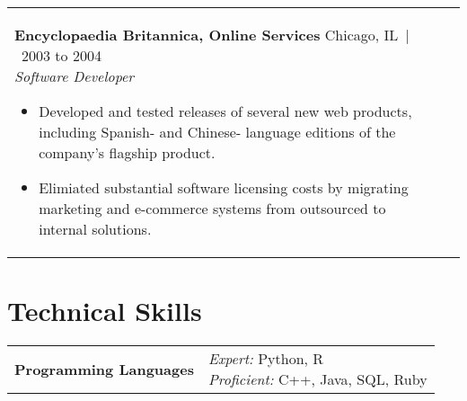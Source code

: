 \documentclass[11pt,letter,sans]{moderncv}
\makeatletter
\newenvironment{entrylistDict}{%
  \begin{tabular*}{\textwidth}{@{\extracolsep{\fill}}ll}
}{%
  \end{tabular*}
}
\newcommand{\entryDict}[2]{%
  \textbf{#1} & \parbox[t]{140mm}{%
    #2%
    \hfill%
    \vspace{\parsep}%
  }\\}
\newenvironment{entrylistFive}{%
  \begin{longtable}{@{\extracolsep{\fill}}ll}
}{%
  \end{longtable}
}
\newcommand{\entryFive}[5]{%
  \parbox[t]{170mm}{%
    \textbf{#2}%
    \hfill%
    {\footnotesize #3~|~#1}\\%
	\emph{#4}\\%
    #5\vspace{\parsep}%
  }\\}
\makeatother
\begin{document}
\begin{entrylistFive}
{\begin{itemize}
\end{itemize}
}
\entryFive
{2003 to 2004}
{Encyclopaedia Britannica, Online Services}
{Chicago, IL}
{Software Developer}
{\vspace{-5mm}
\begin{itemize}
\item {Developed and tested releases of several new web products, including Spanish- and Chinese- language editions of the company's flagship product.}
\item {Elimiated substantial software licensing costs by migrating marketing and e-commerce systems from outsourced to internal solutions.}
\end{itemize}
}
\entryFive
{2001 to 2003}
{ThoughtWorks, LLC}
{Chicago, IL}
{Software Developer/Consultant}
{\vspace{-5mm}
\begin{itemize}
\item {Designed, developed, and enhanced user interface, business logic, and persistence-layer components of large-scale financial software package for the commercial leasing industry.}
\item {Trained members of India development team and helped transition project to an international, round-the-clock effort.}
\item {Co-lead efforts to build web services interoperability lab. Developed Java tools for automated compatibility testing of web service runtime environments.}
\end{itemize}
}
\end{entrylistFive}

\section{Technical Skills}
\begin{entrylistDict}
\entryDict
{Programming Languages}
{\textit{Expert:} Python, R \\ \textit{Proficient:} C++, Java, SQL, Ruby}
\entryDict
{Machine Learning}
{\textit{Python:} scikit-learn, keras, networkX \\ \textit{R:} xgboost, e1071, caret}
\entryDict
{Data Science/Visualization}
{\textit{Python:} Numpy, Pandas, Seaborn \\ \textit{R:} ggplot2, other "tidyverse" packages}
\entryDict
{High-Performance Computing}
{\textit{Containerization:} Docker, Singularity \\
 \textit{Pipelines:} Nextflow, Snakemake, CWL \\
 \textit{Job Scheduling:} SGE, SLURM, LSF}
\entryDict
{Genomics}
{\textit{NGS Assays:} DNA-Seq, RNA-Seq, Methyl-Seq, ATAC-Seq, ChIP-Seq, \\ HiC, Single-Cell (10X, Fluidigm) \\
 \textit{Bioinformatics:} Samtools, BWA, GATK \\
 \textit{Other:} SNP and methylation array analysis}
\end{entrylistDict}
\end{document}
